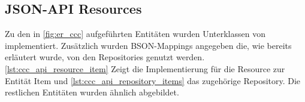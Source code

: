\subsection{JSON-API Resources}
\label{ssec:ba_json_api_resources}

Zu den in \cref{fig:er_ccc} aufgeführten Entitäten wurden Unterklassen von
 implementiert.  Zusätzlich wurden BSON-Mappings
angegeben die, wie bereits erläutert wurde, von den Repositories genutzt
werden.  \cref{lst:ccc_api_resource_item} Zeigt die Implementierung für die
Resource zur Entität Item und \cref{lst:ccc_api_repository_items} das zugehörige
Repository.  Die restlichen Entitäten wurden ähnlich abgebildet.




